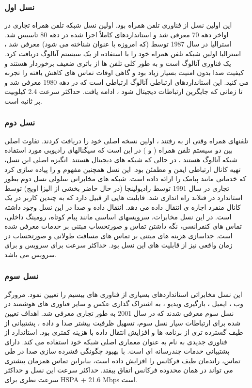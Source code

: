 \subsubsection{نسل اول}
این اولین نسل از فناوری تلفن همراه بود. اولین نسل شبکه تلفن همراه تجاری در اواخر دهه 70 معرفی شد و استانداردهای کاملاً اجرا شده در دهه 80 تاسیس شد. استرالیا در سال 1987 توسط  (که امروزه با عنوان  شناخته می شود) معرفی شد ، استرالیا اولین شبکه تلفن همراه خود را با استفاده از یک سیستم آنالوگ  دریافت کرد.  یک فناوری آنالوگ است و به طور کلی تلفن ها از باتری ضعیف برخوردار هستند و کیفیت صدا بدون امنیت بسیار زیاد بود و گاهی اوقات تماس های کاهش یافته را تجربه می کنید. این استانداردهای ارتباطی آنالوگ ارتباطی است که در دهه 1980 معرفی شد و تا زمانی که جایگزین ارتباطات دیجیتال  شود ، ادامه یافت. حداکثر سرعت  2.4 کیلوبیت بر ثانیه است.
\subsubsection{نسل دوم}
تلفنهای همراه وقتی از  به  رفتند ، اولین نسخه اصلی خود را دریافت کردند. تفاوت اصلی بین دو سیستم تلفن همراه ( و ) در این است که سیگنالهای رادیویی مورد استفاده شبکه  آنالوگ هستند ، در حالی که شبکه های 
 دیجیتال هستند. انگیزه اصلی این نسل، تهیه کانال ارتباطی ایمن و مطمئن بود. این نسل همچنین مفهوم  و  را پیاده سازی کرد که خدماتی مانند پیامک را ارائه داده است. شبکه های مخابراتی سلولی نسل دوم بطور تجاری در سال 1991 توسط رادیولینجا (در حال حاضر بخشی از الیزا اویج) توسط استاندارد  در فنلاند راه اندازی شد.
قابلیت هایی از قبیل
دارد که 
به چندین کاربر در یک کانال منفرد 
اجازه ی انتقال داده می دهد.
انتقال داده و صدا در این نسل وجود داشته است.
در این نسل مخابرات، 
سرویسهای اساسی مانند پیام کوتاه، رومینگ داخلی، تماس های کنفرانسی، نگه داشتن تماس و صورتحساب مبتنی بر خدمات معرفی شده است. جداسازی هزینه های مبتنی بر تماس های مسافت طولانی و صورتحساب در زمان واقعی نیز از قابلیت های این نسل بود.
حداکثر سرعت برای سرویس 
و برای سرویس 
می باشد.
\subsubsection{نسل سوم}
این نسل مخابراتی استانداردهای بسیاری از فناوری های بیسیم را تعیین نمود. مرورگر وب ، ایمیل ، بارگیری ویدیو ، به اشتراک گذاری عکس و سایر فناوری های هوشمند در نسل سوم معرفی شدند که در سال 2001 به طور تجاری معرفی شد. اهداف تعیین شده برای ارتباطات سیار نسل سوم، تسهیل ظرفیت بیشتر صدا و داده ، پشتیبانی از طیف گسترده تری از برنامه ها و افزایش انتقال داده با هزینه کمتری بود.
استاندارد  از فناوری جدیدی به نام
 به عنوان معماری اصلی شبکه خود 
استفاده می کند.
 دارای پشتیبانی خدمات چندرسانه ای است.
  با بهبود چگونگی فشرده سازی صدا در طی تماس، راندمان طیف فرکانس را افزایش داده است، بنابراین تماس همزمان بیشتری می تواند در همان محدوده فرکانس اتفاق بیفتد.
حداکثر سرعت این نسل 
و
حداکثر سرعت نظری برای HSPA + 21.6 Mbps است. 

